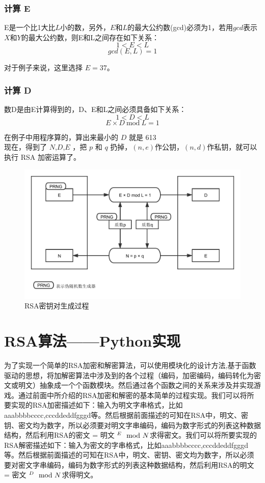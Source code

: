 \documentclass[UTF8,nofonts,cs4size]{ctexrep}
\begin{document}
\subsection{计算 E}
E是一个比1大比$L$小的数，另外，$E$和$L$的最大公约数(gcd)必须为1，若用$gcd$表示$X$和$Y$的最大公约数，则E和L之间存在如下关系：
$$1 < E < L$$
$$gcd(E,L)  = 1$$

\indent 对于例子来说，这里选择 $E = 37$。
\subsection{计算 D}
数D是由E计算得到的，D、E和L之间必须具备如下关系：
$$1 < D < L $$
$$E \times D \ \mathrm{mod}\ L = 1 $$

\indent  在例子中用程序算的，算出来最小的 $D$ 就是 613\\
\indent 现在，得到了 $N$,$D$,$E$ ，把 $p$ 和 $q$ 扔掉，$(n, e)$作公钥，$(n, d)$作私钥，就可以执行 RSA 加密运算了。

\begin{figure}{}
\centering
\includegraphics[scale = 0.8]{RSApair.pdf}
\caption{RSA密钥对生成过程}
\end{figure}


\chapter{RSA算法——Python实现}
为了实现一个简单的RSA加密和解密算法，可以使用模块化的设计方法,基于函数驱动的思想，将加解密算法中涉及到的各个过程（编码，加密编码，编码转化为密文或明文）抽象成一个个函数模块。然后通过各个函数之间的关系来涉及并实现游戏。通过前面中所介绍的RSA加密和解密的基本简单的过程实现。我们可以将所要实现的RSA加密描述如下：输入为明文字串格式，比如aaabbbbcccc,cccddeddfgggd等。然后根据前面描述的可知在RSA中，明文、密钥、密文均为数字，所以必须要对明文字串编码，编码为数字形式的列表这种数据结构，然后利用RSA的密文 = 明文 $^E\mathrm{\mod} N$求得密文。我们可以将所要实现的RSA解密描述如下：输入为密文的字串格式，比如aaabbbbcccc,cccddeddfgggd等。然后根据前面描述的可知在RSA中，明文、密钥、密文均为数字，所以必须要对密文字串编码，编码为数字形式的列表这种数据结构，然后利用RSA的明文 = 密文 $^D\mathrm{\mod} N$求得明文。
\end{document}
